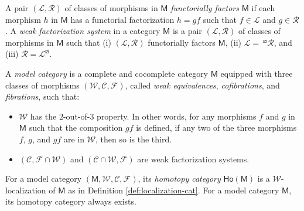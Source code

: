 \documentclass[11pt]{amsbook}
\numberwithin{section}{chapter}
\numberwithin{subsection}{section}
\numberwithin{equation}{section}
\theoremstyle{plain}
\theoremstyle{definition}
\newcommand{\calc}{\mathcal{C}}
\newcommand{\calf}{\mathcal{F}}
\newcommand{\call}{\mathcal{L}}
\newcommand{\calr}{\mathcal{R}}
\newcommand{\calw}{\mathcal{W}}
\newcommand{\M}{\mathsf{M}}
\newcommand{\Ho}{\mathsf{Ho}}
\begin{document}
A pair $(\call,\calr)$ of classes of morphisms in $\M$ \emph{functorially factors} $\M$ if each morphism $h$ in $\M$ has a functorial factorization $h=gf$ such that $f \in \call$ and $g \in \calr$.  A \emph{weak factorization system} in a category $\M$ is a pair $(\call,\calr)$ of classes of morphisms in $\M$ such that (i) $(\call,\calr)$ functorially factors $\M$, (ii) $\call = \> {}^{\boxslash}\!\calr$, and (iii) $\calr = \call^{\boxslash}$.

A \emph{model category} is a complete and cocomplete category $\M$ equipped with three classes of morphisms\label{notation:wcf} $(\calw, \calc,\calf)$, called \emph{weak equivalences}, \emph{cofibrations}, and \emph{fibrations}, such that:
\begin{itemize} \item $\calw$ has the $2$-out-of-$3$ property.  In other words, for any morphisms $f$ and $g$ in $\M$ such that the composition $gf$ is defined, if any two of the three morphisms $f$, $g$, and $gf$ are in $\calw$, then so is the third.
\item $(\calc, \calf \cap \calw)$ and $(\calc \cap \calw,\calf)$ are weak factorization systems.\end{itemize}
For a model category $(\M,\calw,\calc,\calf)$, its \emph{homotopy category}\label{notation:homotopy-cat} $\Ho(\M)$ is a $\calw$-localization of $\M$ as in Definition \ref{def:localization-cat}.  For a model category $\M$, its homotopy category always exists.
\end{document}
